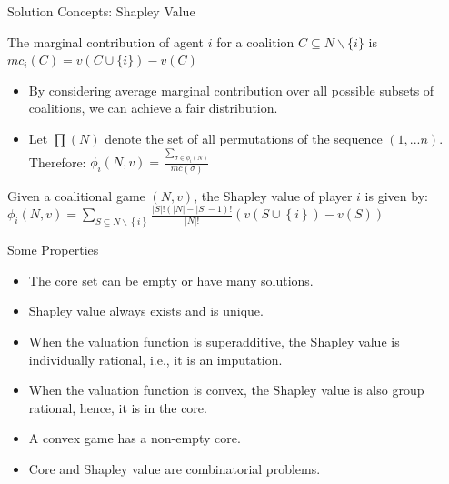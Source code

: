 \documentclass{beamer}
\begin{document}
%
\begin{frame}{Solution Concepts: Shapley Value}
    \begin{definition} \label{dfn:marginalcontribution}
        The {\color{blue}marginal contribution} of agent $i$ for a coalition $C \subseteq N \backslash \{i\}$ is $mc_i(C) = v(C \cup \{i\}) - v(C)$
    \end{definition}

    \begin{itemize}
        \item By considering average marginal contribution over all possible subsets of coalitions, we can achieve a fair distribution.\\
        \item Let $\prod(N)$ denote the set of all permutations of the sequence $(1,...n)$. Therefore: $\phi_i(N,v) = \frac{\sum_{\sigma \in \phi_i(N)}}{mc(\sigma)}$
    \end{itemize}

    \begin{definition} \label{dfn:shapleyvalue}
        Given a coalitional game $(N,v)$, the Shapley value of player $i$ is given by: \\
        $\phi_i(N,v) = \sum_{S \subseteq N \backslash \left\{i\right\} } \frac{|S|! (|N|-|S|-1)!}{|N|!} (v(S \cup \left\{i\right\}) - v(S))$
    \end{definition}
\end{frame}
\begin{frame}{Some Properties}
    \begin{itemize}
        \item The core set can be empty or have many solutions.
        \item Shapley value always exists and is unique.
        \item When the valuation function is {\color{blue}superadditive}, the Shapley value is {\color{blue}individually rational}, i.e., it is an imputation.
        \item When the valuation function is {\color{blue}convex}, the Shapley value is also group rational, hence, it is in the {\color{blue}core}.
        \item A convex game has a non-empty core.
        \item Core and Shapley value are combinatorial problems.
    \end{itemize}
\end{frame}
\end{document}
